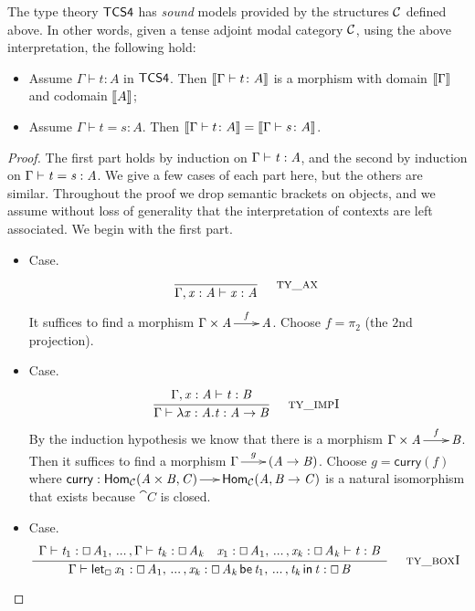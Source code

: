 \begin{theorem*}
The type theory $\sf{TCS4}$ has \textit{sound} models provided by the
structures $\cal C$ defined above.  In other words, given a tense
adjoint modal category $\cal C$, using the above interpretation, the
following hold:
\begin{itemize}
\item Assume $\Gamma \vdash t : A$ in $\sf{TCS4}$. Then $\sem{\Gamma
  \vdash t \colon A}$ is a morphism with domain $\sem{\Gamma}$ and
  codomain $\sem{A}$;
\item Assume $\Gamma \vdash t = s \colon A$. Then $\sem{\Gamma
  \vdash t \colon A} = \sem{\Gamma \vdash s \colon A}$.
\end{itemize}
\end{theorem*}
\begin{proof}
  The first part holds by induction on $\Gamma  \vdash  \TLLnt{t}  \TLLsym{:}  \TLLnt{A}$, and the
  second by induction on $ \Gamma  \vdash  \TLLnt{t}  =  \TLLnt{s}  :  \TLLnt{A} $.  We give a few cases of
  each part here, but the others are similar.  Throughout the proof we
  drop semantic brackets on objects, and we assume without loss of
  generality that the interpretation of contexts are left associated.
  We begin with the first part.

  \begin{itemize}
  \item[] Case.\\
    \[
    \TLLdruletyXXax{}
    \]
    It suffices to find a morphism $\Gamma \times \TLLnt{A} \mto^{f}
    \TLLnt{A}$.  Choose $f = \pi_2$ (the $2$nd projection).

    \item[] Case.\\
    \[
    \TLLdruletyXXimpI{}
    \]
    By the induction hypothesis we know that there is a morphism
    $\Gamma \times \TLLnt{A} \mto^f \TLLnt{B}$.  Then it suffices to find a
    morphism $\Gamma \mto^{g} (\TLLnt{A}  \to  \TLLnt{B})$.  Choose $g =
    \mathsf{curry}(f)$ where $\mathsf{curry} :
    \mathsf{Hom}_{\cat{C}}( \TLLnt{A}  \times  \TLLnt{B} ,\TLLnt{C}) \mto
    \mathsf{Hom}_{\cat{C}}(\TLLnt{A},\TLLnt{B}  \to  \TLLnt{C})$ is a natural isomorphism
    that exists because $\cat{C}$ is closed.

  \item[] Case.\\
    \[
    \TLLdruletyXXboxI{}
    \]


\end{itemize}
\end{proof}
